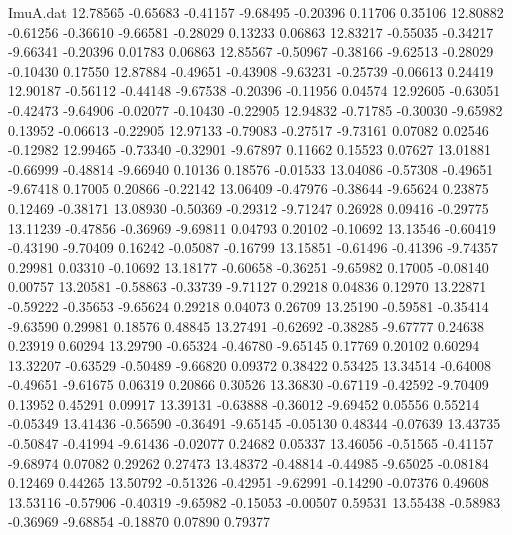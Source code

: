 \begin{filecontents}{ImuA.dat}
  12.78565   -0.65683   -0.41157   -9.68495   -0.20396    0.11706    0.35106
  12.80882   -0.61256   -0.36610   -9.66581   -0.28029    0.13233    0.06863
  12.83217   -0.55035   -0.34217   -9.66341   -0.20396    0.01783    0.06863
  12.85567   -0.50967   -0.38166   -9.62513   -0.28029   -0.10430    0.17550
  12.87884   -0.49651   -0.43908   -9.63231   -0.25739   -0.06613    0.24419
  12.90187   -0.56112   -0.44148   -9.67538   -0.20396   -0.11956    0.04574
  12.92605   -0.63051   -0.42473   -9.64906   -0.02077   -0.10430   -0.22905
  12.94832   -0.71785   -0.30030   -9.65982    0.13952   -0.06613   -0.22905
  12.97133   -0.79083   -0.27517   -9.73161    0.07082    0.02546   -0.12982
  12.99465   -0.73340   -0.32901   -9.67897    0.11662    0.15523    0.07627
  13.01881   -0.66999   -0.48814   -9.66940    0.10136    0.18576   -0.01533
  13.04086   -0.57308   -0.49651   -9.67418    0.17005    0.20866   -0.22142
  13.06409   -0.47976   -0.38644   -9.65624    0.23875    0.12469   -0.38171
  13.08930   -0.50369   -0.29312   -9.71247    0.26928    0.09416   -0.29775
  13.11239   -0.47856   -0.36969   -9.69811    0.04793    0.20102   -0.10692
  13.13546   -0.60419   -0.43190   -9.70409    0.16242   -0.05087   -0.16799
  13.15851   -0.61496   -0.41396   -9.74357    0.29981    0.03310   -0.10692
  13.18177   -0.60658   -0.36251   -9.65982    0.17005   -0.08140    0.00757
  13.20581   -0.58863   -0.33739   -9.71127    0.29218    0.04836    0.12970
  13.22871   -0.59222   -0.35653   -9.65624    0.29218    0.04073    0.26709
  13.25190   -0.59581   -0.35414   -9.63590    0.29981    0.18576    0.48845
  13.27491   -0.62692   -0.38285   -9.67777    0.24638    0.23919    0.60294
  13.29790   -0.65324   -0.46780   -9.65145    0.17769    0.20102    0.60294
  13.32207   -0.63529   -0.50489   -9.66820    0.09372    0.38422    0.53425
  13.34514   -0.64008   -0.49651   -9.61675    0.06319    0.20866    0.30526
  13.36830   -0.67119   -0.42592   -9.70409    0.13952    0.45291    0.09917
  13.39131   -0.63888   -0.36012   -9.69452    0.05556    0.55214   -0.05349
  13.41436   -0.56590   -0.36491   -9.65145   -0.05130    0.48344   -0.07639
  13.43735   -0.50847   -0.41994   -9.61436   -0.02077    0.24682    0.05337
  13.46056   -0.51565   -0.41157   -9.68974    0.07082    0.29262    0.27473
  13.48372   -0.48814   -0.44985   -9.65025   -0.08184    0.12469    0.44265
  13.50792   -0.51326   -0.42951   -9.62991   -0.14290   -0.07376    0.49608
  13.53116   -0.57906   -0.40319   -9.65982   -0.15053   -0.00507    0.59531
  13.55438   -0.58983   -0.36969   -9.68854   -0.18870    0.07890    0.79377

\end{filecontents}

